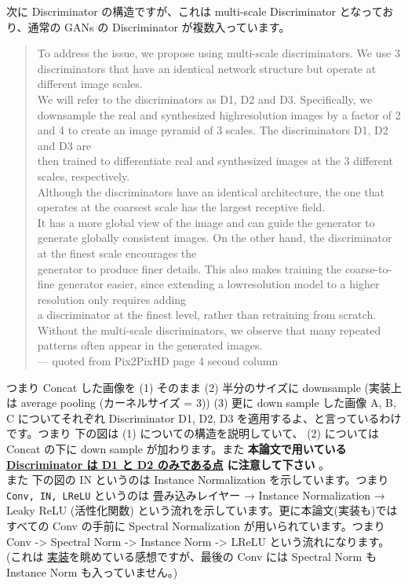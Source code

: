\documentclass[a4paper, dvipdfmx, 10pt]{article}
\begin{document}
次に Discriminator の構造ですが、これは multi-scale Discriminator となっており、通常の GANs の Discriminator が複数入っています。\\
\begin{quote}
To address the issue, we propose using multi-scale discriminators. We use 3 discriminators that have an identical network structure but operate at different image scales.\\
We will refer to the discriminators as D1, D2 and D3. Specifically, we downsample the real and synthesized highresolution images by a factor of 2 and 4 to create an image pyramid of 3 scales. The discriminators D1, D2 and D3 are\\
then trained to differentiate real and synthesized images at the 3 different scales, respectively.\\
Although the discriminators have an identical architecture, the one that operates at the coarsest scale has the largest receptive field.\\
It has a more global view of the image and can guide the generator to generate globally consistent images. On the other hand, the discriminator at the finest scale encourages the\\
generator to produce finer details. This also makes training the coarse-to-fine generator easier, since extending a lowresolution model to a higher resolution only requires adding\\
a discriminator at the finest level, rather than retraining from scratch.\\
Without the multi-scale discriminators, we observe that many repeated patterns often appear in the generated images.\\

--- quoted from Pix2PixHD page 4 second column\\
\end{quote}

つまり Concat した画像を (1) そのまま (2) 半分のサイズに downsample (実装上は average pooling (カーネルサイズ = 3)) (3) 更に down sample した画像 A, B, C についてそれぞれ Discriminator D1, D2, D3 を適用するよ、と言っているわけです。つまり 下の図は (1) についての構造を説明していて、 (2) については Concat の下に down sample が加わります。また \textbf{\textbf{本論文で用いている \href{https://github.com/NVlabs/SPADE/issues/50\#issuecomment-494217696}{Discriminator は D1 と D2 のみである点} に注意して下さい}} 。\\

また 下の図の IN というのは Instance Normalization を示しています。つまり \texttt{Conv, IN, LReLU} というのは 畳み込みレイヤー → Instance Normalization → Leaky ReLU (活性化関数) という流れを示しています。更に本論文(実装も)ではすべての Conv の手前に Spectral Normalization が用いられています。つまり Conv -> Spectral Norm -> Instance Norm -> LReLU という流れになります。(これは \href{https://github.com/NVlabs/SPADE/blob/1a687baeada266a3c92be41295f1ea3d5efd4f93/models/networks/discriminator.py\#L83-L96}{実装}を眺めている感想ですが、最後の Conv には Spectral Norm も Instance Norm も入っていません。)\\
\end{document}
